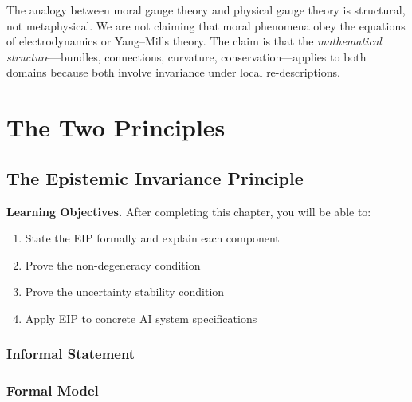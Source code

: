 \documentclass[12pt,letterpaper,twoside,openright]{book}
\theoremstyle{plain}
\theoremstyle{definition}
\theoremstyle{remark}
\newcommand{\calT}{\mathcal{T}}
\newcommand{\equivX}{\equiv_X}
\begin{document}
\begin{pitfall}
The analogy between moral gauge theory and physical gauge theory is structural, not metaphysical. We are not claiming that moral phenomena obey the equations of electrodynamics or Yang--Mills theory. The claim is that the \textit{mathematical structure}---bundles, connections, curvature, conservation---applies to both domains because both involve invariance under local re-descriptions.
\end{pitfall}


\part{The Two Principles}
\label{part:principles}

\chapter{The Epistemic Invariance Principle}
\label{ch:eip}

\begin{framed}
\noindent\textbf{Learning Objectives.} After completing this chapter, you will be able to:
\begin{enumerate}
    \item State the EIP formally and explain each component
    \item Prove the non-degeneracy condition
    \item Prove the uncertainty stability condition
    \item Apply EIP to concrete AI system specifications
\end{enumerate}
\end{framed}

\section{Informal Statement}

\section{Formal Model}
\end{document}

